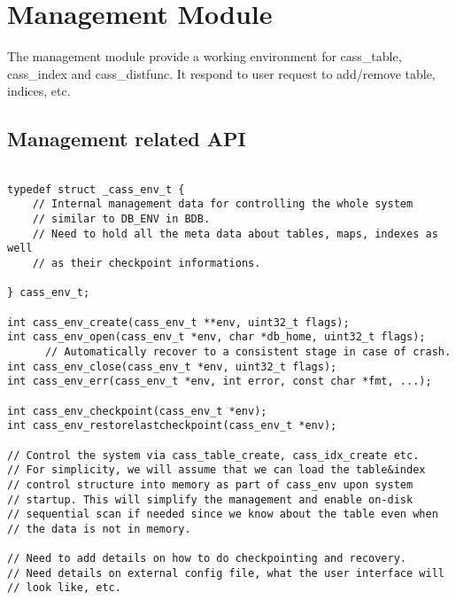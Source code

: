 %       
% 
% 
% 
\section{Management Module}
The management module provide a working environment for cass\_table,
cass\_index and cass\_distfunc. It respond to user request to
add/remove table, indices, etc. 

\subsection {Management related API}
\begin{verbatim}

typedef struct _cass_env_t {
    // Internal management data for controlling the whole system 
    // similar to DB_ENV in BDB.
    // Need to hold all the meta data about tables, maps, indexes as well
    // as their checkpoint informations.
    
} cass_env_t; 

int cass_env_create(cass_env_t **env, uint32_t flags);
int cass_env_open(cass_env_t *env, char *db_home, uint32_t flags); 
      // Automatically recover to a consistent stage in case of crash.
int cass_env_close(cass_env_t *env, uint32_t flags);
int cass_env_err(cass_env_t *env, int error, const char *fmt, ...);

int cass_env_checkpoint(cass_env_t *env);
int cass_env_restorelastcheckpoint(cass_env_t *env);

// Control the system via cass_table_create, cass_idx_create etc.
// For simplicity, we will assume that we can load the table&index
// control structure into memory as part of cass_env upon system
// startup. This will simplify the management and enable on-disk
// sequential scan if needed since we know about the table even when 
// the data is not in memory.

// Need to add details on how to do checkpointing and recovery.
// Need details on external config file, what the user interface will
// look like, etc.
\end{verbatim}
